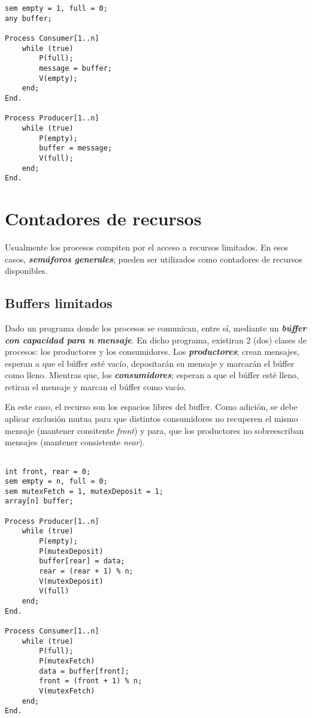 \documentclass[a4paper, 10pt]{report}
\begin{document}
\begin{lstlisting}[multicols=2]
sem empty = 1, full = 0;
any buffer;

Process Consumer[1..n]
    while (true)
        P(full);
        message = buffer;
        V(empty);
    end;
End.

Process Producer[1..n]
    while (true)
        P(empty);
        buffer = message;
        V(full);
    end;
End.
\end{lstlisting}

\section{Contadores de recursos}

Usualmente los procesos compiten por el acceso a recursos limitados. En esos casos, \textbf{\emph{semáforos generales}}; pueden ser utilizados como contadores de recursos disponibles.

\subsection{Buffers limitados}

Dado un programa donde los procesos se comunican, entre sí, mediante un \textbf{\emph{búffer con capacidad para n mensaje}}. En dicho programa, existiran 2 (dos) clases de procesos: los productores y los consumidores. Los \textbf{\emph{productores}}; crean mensajes, esperan a que el búffer esté vacío, depositarán su mensaje y marcarán el búffer como lleno. Mientras que, los \textbf{\emph{consumidores}}; esperan a que el búffer esté lleno, retiran el mensaje y marcan el búffer como vacío.

En este caso, el recurso son los espacios libres del buffer. Como adición, se debe aplicar exclusión mutua para que distintos consumidores no recuperen el mismo mensaje (mantener consitente \emph{front}) y para, que los productores no sobreescriban mensajes (mantener consistente \emph{near}).

\begin{lstlisting}[multicols=2]

int front, rear = 0;
sem empty = n, full = 0;
sem mutexFetch = 1, mutexDeposit = 1;
array[n] buffer; 

Process Producer[1..n]
    while (true)
        P(empty);
        P(mutexDeposit)
        buffer[rear] = data;
        rear = (rear + 1) % n;
        V(mutexDeposit)
        V(full)
    end;
End.

Process Consumer[1..n]
    while (true)
        P(full);
        P(mutexFetch)
        data = buffer[front];
        front = (front + 1) % n;
        V(mutexFetch)
    end;
End.
\end{lstlisting}
\end{document}
